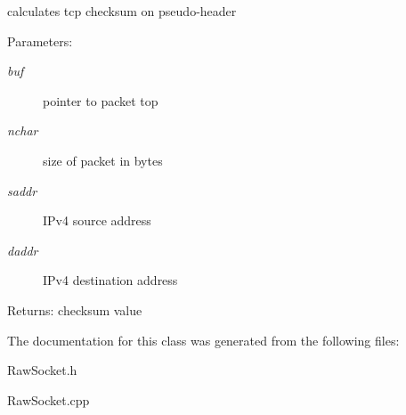 calculates tcp checksum on pseudo-header 

\begin{Desc}
\item[Parameters:]
\begin{description}
\item[{\em buf}]pointer to packet top \item[{\em nchar}]size of packet in bytes \item[{\em saddr}]IPv4 source address \item[{\em daddr}]IPv4 destination address \end{description}
\end{Desc}
\begin{Desc}
\item[Returns:]checksum value \end{Desc}


The documentation for this class was generated from the following files:\begin{CompactItemize}
\item 
RawSocket.h\item 
RawSocket.cpp\end{CompactItemize}

